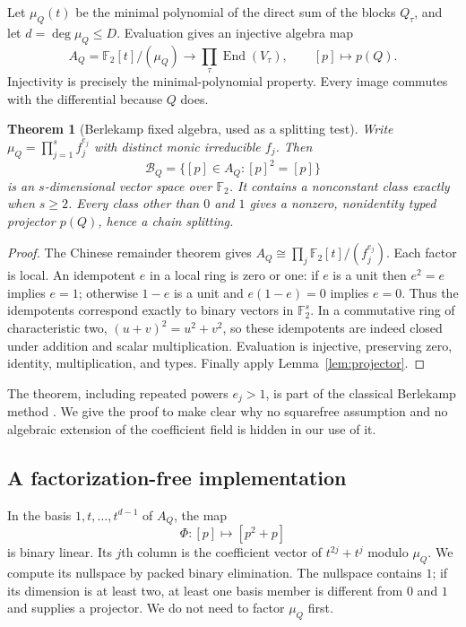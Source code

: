 \documentclass[11pt,a4paper]{article}
\newtheorem{theorem}{Theorem}[section]
\theoremstyle{definition}\newtheorem{definition}[theorem]{Definition}
\theoremstyle{remark}\newtheorem{remark}[theorem]{Remark}
\newcommand{\F}{\mathbb F_2}
\newcommand{\End}{\operatorname{End}}
\begin{document}
Let $\mu_Q(t)$ be the minimal polynomial of the direct sum of the blocks
$Q_\tau$, and let $d=\deg\mu_Q\le D$. Evaluation gives an injective algebra map
\[
 A_Q=\F[t]/(\mu_Q)\longrightarrow\prod_\tau\End(V_\tau),\qquad
 [p]\longmapsto p(Q).
\]
Injectivity is precisely the minimal-polynomial property. Every image
commutes with the differential because $Q$ does.

\begin{theorem}[Berlekamp fixed algebra, used as a splitting test]
\label{thm:fixed}
Write
$\mu_Q=\prod_{j=1}^s f_j^{e_j}$ with distinct monic irreducible $f_j$.
Then
\[
 \mathcal B_Q=\{[p]\in A_Q:[p]^2=[p]\}
\]
is an $s$-dimensional vector space over $\F$. It contains a nonconstant
class exactly when $s\ge2$. Every class other than $0$ and $1$ gives a
nonzero, nonidentity typed projector $p(Q)$, hence a chain splitting.
\end{theorem}
\begin{proof}
The Chinese remainder theorem gives
$A_Q\cong\prod_j\F[t]/(f_j^{e_j})$. Each factor is local. An idempotent
$e$ in a local ring is zero or one: if $e$ is a unit then $e^2=e$ implies
$e=1$; otherwise $1-e$ is a unit and $e(1-e)=0$ implies $e=0$.
Thus the idempotents correspond exactly to binary vectors in $\F^s$.
In a commutative ring of characteristic two, $(u+v)^2=u^2+v^2$, so these
idempotents are indeed closed under addition and scalar multiplication.
Evaluation is injective, preserving zero, identity, multiplication, and
types. Finally apply Lemma~\ref{lem:projector}.
\end{proof}

The theorem, including repeated powers $e_j>1$, is part of the classical
Berlekamp method \cite[pp.~1854--1858]{berlekamp}. We give the proof to make
clear why no squarefree assumption and no algebraic extension of the
coefficient field is hidden in our use of it.

\subsection{A factorization-free implementation}

In the basis $1,t,\ldots,t^{d-1}$ of $A_Q$, the map
\[
 \Phi:[p]\longmapsto[p^2+p]
\]
is binary linear. Its $j$th column is the coefficient vector of
$t^{2j}+t^j$ modulo $\mu_Q$. We compute its nullspace by packed binary
elimination. The nullspace contains $1$; if its dimension is at least
two, at least one basis member is different from $0$ and $1$ and supplies
a projector. We do not need to factor $\mu_Q$ first.
\end{document}
